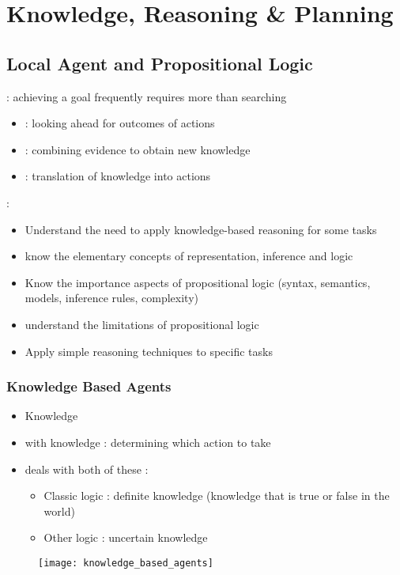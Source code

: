 \chapter{Knowledge, Reasoning \& Planning}

\section{Local Agent and Propositional Logic}

 : achieving a goal frequently requires more than searching
\begin{itemize}
\item {} : looking ahead for outcomes of actions
\item {} : combining evidence to obtain new knowledge
\item {} : translation of knowledge into actions
\end{itemize}

 :
\begin{itemize}
\item Understand the need to apply knowledge-based reasoning for some tasks
\item know the elementary concepts of representation, inference and logic
\item Know the importance aspects of propositional logic (syntax, semantics, models, inference rules, complexity)
\item understand the limitations of propositional logic
\item Apply simple reasoning techniques to specific tasks
\end{itemize}

\subsection{Knowledge Based Agents}

\begin{minipage}{0.6\textwidth}
	\begin{itemize}
	\item Knowledge 
	\item {} with knowledge : determining which action to take
	\item {} deals with both of these :
		\begin{itemize}
		\item Classic logic : definite knowledge (knowledge that is true or false in the world)
		\item Other logic : uncertain knowledge
		\end{itemize}
	\end{itemize}
\end{minipage}
\begin{minipage}{0.4\textwidth}
	\begin{figure}[H]
		\centering
		\texttt{[image: knowledge\_based\_agents]}
	\end{figure}
\end{minipage}

